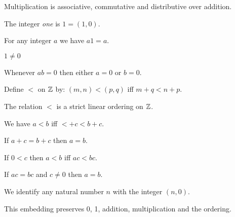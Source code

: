 \begin{theorem}
    Multiplication is associative, commutative and distributive over addition.
\end{theorem}

\begin{definition}
    The integer \emph{one} is $1 = (1,0)$.
\end{definition}

\begin{theorem}
    For any integer $a$ we have $a1 = a$.
\end{theorem}

\begin{theorem}
    $1 \neq 0$
\end{theorem}

\begin{theorem}
    Whenever $ab = 0$ then either $a = 0$ or $b = 0$.
\end{theorem}

\begin{definition}
    Define $<$ on $\mathbb{Z}$ by: $(m,n) < (p,q)$ iff $m + q < n + p$.
\end{definition}

\begin{theorem}
    The relation $<$ is a strict linear ordering on $\mathbb{Z}$.
\end{theorem}

\begin{theorem}
    We have $a < b$ iff $< + c < b + c$.
\end{theorem}

\begin{corollary}
    If $a + c = b + c$ then $a = b$.
\end{corollary}

\begin{theorem}
    If $0 < c$ then $a < b$ iff $ac < bc$.
\end{theorem}

\begin{corollary}
    If $ac = bc$ and $c \neq 0$ then $a = b$.
\end{corollary}

\begin{definition}
    We identify any natural number $n$ with the integer $(n,0)$.
\end{definition}

\begin{theorem}
    This embedding preserves 0, 1, addition, multiplication and the ordering.
\end{theorem}

